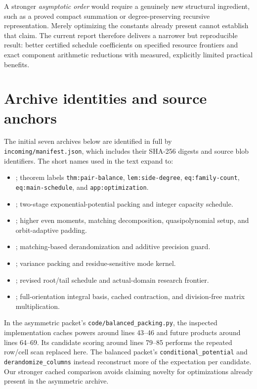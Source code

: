 \documentclass[11pt,letterpaper]{article}
\theoremstyle{remark}\newtheorem{remark}[theorem]{Remark}
\begin{document}
A stronger \emph{asymptotic order} would require a genuinely new structural ingredient, such as a proved compact summation or degree-preserving recursive representation. Merely optimizing the constants already present cannot establish that claim. The current report therefore delivers a narrower but reproducible result: better certified schedule coefficients on specified resource frontiers and exact component arithmetic reductions with measured, explicitly limited practical benefits.

\appendix
\section{Archive identities and source anchors}
The initial seven archives below are identified in full by \texttt{incoming/manifest.json}, which includes their SHA-256 digests and source blob identifiers. The short names used in the text expand to:
\begin{itemize}
\item {}; theorem labels \texttt{thm:pair-balance}, \texttt{lem:side-degree}, \texttt{eq:family-count}, \texttt{eq:main-schedule}, and \texttt{app:optimization}.
\item {}; two-stage exponential-potential packing and integer capacity schedule.
\item {}; higher even moments, matching decomposition, quasipolynomial setup, and orbit-adaptive padding.
\item {}; matching-based derandomization and additive precision guard.
\item {}; variance packing and residue-sensitive mode kernel.
\item {}; revised root/tail schedule and actual-domain research frontier.
\item {}; full-orientation integral basis, cached contraction, and division-free matrix multiplication.
\end{itemize}
In the asymmetric packet's \texttt{code/balanced\_packing.py}, the inspected implementation caches powers around lines 43--46 and future products around lines 64--69. Its candidate scoring around lines 79--85 performs the repeated row/cell scan replaced here. The balanced packet's \texttt{conditional\_potential} and \texttt{derandomize\_columns} instead reconstruct more of the expectation per candidate. Our stronger cached comparison avoids claiming novelty for optimizations already present in the asymmetric archive.
\end{document}
